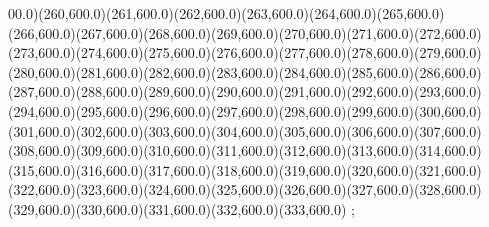 {00.0)(260,600.0)(261,600.0)(262,600.0)(263,600.0)(264,600.0)(265,600.0)(266,600.0)(267,600.0)(268,600.0)(269,600.0)(270,600.0)(271,600.0)(272,600.0)(273,600.0)(274,600.0)(275,600.0)(276,600.0)(277,600.0)(278,600.0)(279,600.0)(280,600.0)(281,600.0)(282,600.0)(283,600.0)(284,600.0)(285,600.0)(286,600.0)(287,600.0)(288,600.0)(289,600.0)(290,600.0)(291,600.0)(292,600.0)(293,600.0)(294,600.0)(295,600.0)(296,600.0)(297,600.0)(298,600.0)(299,600.0)(300,600.0)(301,600.0)(302,600.0)(303,600.0)(304,600.0)(305,600.0)(306,600.0)(307,600.0)(308,600.0)(309,600.0)(310,600.0)(311,600.0)(312,600.0)(313,600.0)(314,600.0)(315,600.0)(316,600.0)(317,600.0)(318,600.0)(319,600.0)(320,600.0)(321,600.0)(322,600.0)(323,600.0)(324,600.0)(325,600.0)(326,600.0)(327,600.0)(328,600.0)(329,600.0)(330,600.0)(331,600.0)(332,600.0)(333,600.0)
        };

